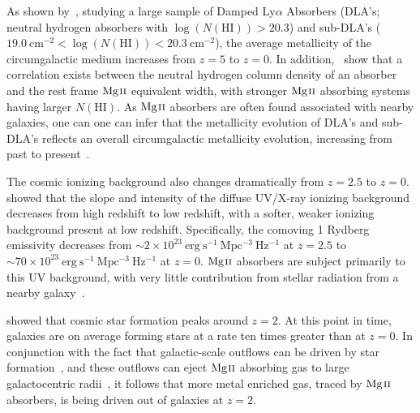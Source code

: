 \documentclass[iop,apj,numberedappendix,appendixfloats,twocolappendix]{emulateapj}
\begin{document}
As shown by~\cite{Quiret2016}, studying a large sample of Damped Ly$\alpha$ Absorbers (DLA's; neutral hydrogen absorbers with $\log(N(\mathrm{HI})) > 20.3$) and sub-DLA's ($19.0~\mathrm{cm^{-2}} < \log(N(\mathrm{HI})) < 20.3~\mathrm{cm^{-2}}$), the average metallicity of the circumgalactic medium increases from $z = 5$ to $z = 0$. In addition,~\cite{Menard2009} show that a correlation exists between the neutral hydrogen column density of an absorber and the rest frame ${\hbox{{\rm Mg}\kern 0.1em{\sc ii}}}$ equivalent width, with stronger ${\hbox{{\rm Mg}\kern 0.1em{\sc ii}}}$ absorbing systems having larger $N(\mathrm{HI})$. As ${\hbox{{\rm Mg}\kern 0.1em{\sc ii}}}$ absorbers are often found associated with nearby galaxies, one can one can infer that the metallicity evolution of DLA's and sub-DLA's reflects an overall circumgalactic metallicity evolution, increasing from past to present~\citep{Kulkarni2002,Prochaska2003,Kulkarni2005,Kulkarni2007}. 



The cosmic ionizing background also changes dramatically from $z = 2.5$ to $z = 0$. \cite{Haardt2012} showed that the slope and intensity of the diffuse UV/X-ray ionizing background decreases from high redshift to low redshift, with a softer, weaker ionizing background present at low redshift. Specifically, the comoving 1 Rydberg emissivity decreases from $\sim2 \times 10^{23}~\mathrm{erg~s^{-1}~Mpc^{-3}~Hz^{-1}}$ at $z = 2.5$ to $\sim70 \times 10^{23}~\mathrm{erg~s^{-1}~Mpc^{-3}~Hz^{-1}}$ at $z = 0$. ${\hbox{{\rm Mg}\kern 0.1em{\sc ii}}}$ absorbers are subject primarily to this UV background, with very little contribution from stellar radiation from a nearby galaxy~\citep{Churchill1999,Charlton2000,Rigby2002}.

\cite{Behroozi2013sfr} showed that cosmic star formation peaks around $z = 2$. At this point in time, galaxies are on average forming stars at a rate ten times greater than at $z = 0$. In conjunction with the fact that galactic-scale outflows can be driven by star formation~\citep{Zhu2015}, and these outflows can eject ${\hbox{{\rm Mg}\kern 0.1em{\sc ii}}}$ absorbing gas to large galactocentric radii~\citep{Sharma2013,Kacprzak2012-PA,Nestor2011}, it follows that more metal enriched gas, traced by ${\hbox{{\rm Mg}\kern 0.1em{\sc ii}}}$ absorbers, is being driven out of galaxies at $z = 2$. 
\end{document}
